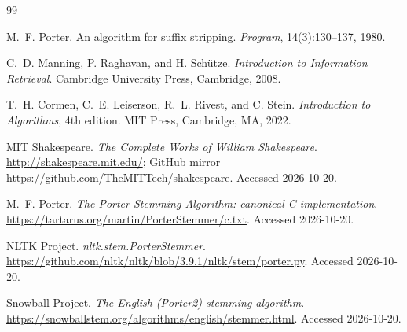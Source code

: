 
\clearpage
\renewcommand{\refname}{References}
\begin{thebibliography}{99}

  M.~F. Porter.
  An algorithm for suffix stripping.
  \emph{Program}, 14(3):130--137, 1980.

  C.~D. Manning, P. Raghavan, and H. Sch\"utze.
  \emph{Introduction to Information Retrieval}.
  Cambridge University Press, Cambridge, 2008.

  T.~H. Cormen, C.~E. Leiserson, R.~L. Rivest, and C. Stein.
  \emph{Introduction to Algorithms}, 4th edition.
  MIT Press, Cambridge, MA, 2022.

  MIT Shakespeare.
  \emph{The Complete Works of William Shakespeare}.
  \url{http://shakespeare.mit.edu/};
  GitHub mirror \url{https://github.com/TheMITTech/shakespeare}.
  Accessed 2026-10-20.

  M.~F. Porter.
  \emph{The Porter Stemming Algorithm: canonical C implementation}.
  \url{https://tartarus.org/martin/PorterStemmer/c.txt}.
  Accessed 2026-10-20.

  NLTK Project.
  \emph{nltk.stem.PorterStemmer}.
  \url{https://github.com/nltk/nltk/blob/3.9.1/nltk/stem/porter.py}.
  Accessed 2026-10-20.

  Snowball Project.
  \emph{The English (Porter2) stemming algorithm}.
  \url{https://snowballstem.org/algorithms/english/stemmer.html}.
  Accessed 2026-10-20.

\end{thebibliography}
